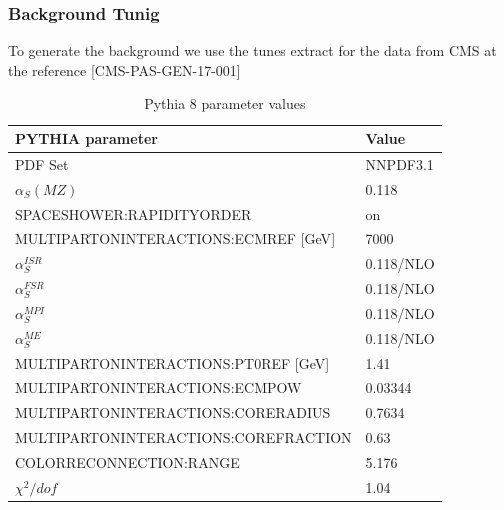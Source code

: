 \documentclass{beamer}
\begin{document}
\begin{frame}
\frametitle{Background Tunig}
{\small To generate the background we use the tunes extract for the data from CMS at the reference [CMS-PAS-GEN-17-001] }

{\scriptsize
\begin{table}[]
	\begin{tabular}{ll}
		\hline
		\textbf{PYTHIA parameter}                & \textbf{Value} \\\hline
		PDF Set                                  & NNPDF3.1       \\
		$\alpha_S(MZ)$                           & 0.118          \\
		SPACESHOWER:RAPIDITYORDER                & on             \\
		MULTIPARTONINTERACTIONS:ECMREF {[}GeV{]} & 7000           \\
		$\alpha^{ISR}_S$                         & 0.118/NLO      \\
		$\alpha^{FSR}_S$                         & 0.118/NLO      \\
		$\alpha^{MPI}_S$                         & 0.118/NLO      \\
		$\alpha^{ME}_S$                          & 0.118/NLO      \\
		MULTIPARTONINTERACTIONS:PT0REF {[}GeV{]} & 1.41           \\
		MULTIPARTONINTERACTIONS:ECMPOW           & 0.03344        \\
		MULTIPARTONINTERACTIONS:CORERADIUS       & 0.7634         \\
		MULTIPARTONINTERACTIONS:COREFRACTION     & 0.63           \\
		COLORRECONNECTION:RANGE                  & 5.176          \\
		$\chi^2/dof$                             & 1.04           \\\hline
	\end{tabular}
		\caption{Pythia 8 parameter values }
		\label{PythiaTune}

\end{table}
}

\end{frame}

\end{document}
